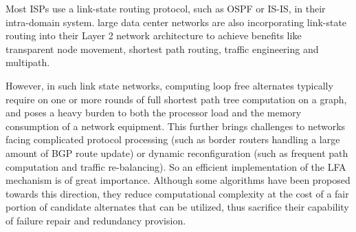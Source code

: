 Most ISPs use a link-state routing protocol, such as OSPF or IS-IS, in their intra-domain system.
large data center networks are also incorporating link-state routing into their Layer 2 network architecture \cite{perlman2011introduction, TRILL} 
to achieve benefits like transparent node movement, shortest path routing, traffic engineering and multipath.


However, in such link state networks, computing loop free alternates typically require on one or more rounds
of full shortest path tree computation on a graph, and poses a heavy burden to both the processor load and
the memory consumption of a network equipment. This further brings challenges to networks
facing complicated protocol processing (such as border routers handling a large amount of BGP route update)
or dynamic reconfiguration (such as frequent path computation and traffic re-balancing).
So an efficient implementation of the LFA mechanism is of great importance. Although some algorithms \cite{TBFH, Geng2018A}
have been proposed towards this direction, they reduce computational complexity at the cost of
a fair portion of candidate alternates that can be utilized, thus sacrifice their capability of failure repair and
redundancy provision.

